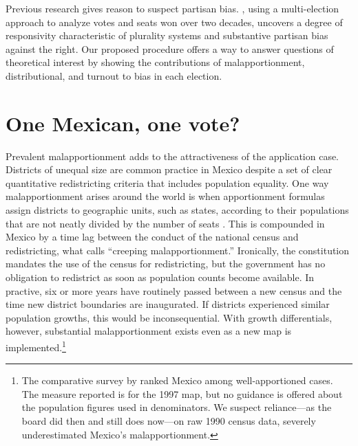 \documentclass[letter,12pt]{article}
\begin{document}
{Previous research gives reason to suspect partisan bias. \citet{marquez2014biasBlog}, using a multi-election approach to analyze votes and seats won over two decades, uncovers a degree of responsivity characteristic of plurality systems and substantive partisan bias against the right. Our proposed procedure offers a way to answer questions of theoretical interest by showing the contributions of malapportionment, distributional, and turnout to bias in each election. 

\section{One Mexican, one vote?}


Prevalent malapportionment adds to the attractiveness of the application case. Districts of unequal size are common practice in Mexico despite a set of clear quantitative redistricting criteria that includes population equality. One way malapportionment arises around the world is when apportionment formulas assign districts to geographic units, such as states, according to their populations that are not neatly divided by the number of seats \citep{balinskiYoung2001FairRep}. This is compounded in Mexico by a time lag between the conduct of the national census and redistricting, what \citet{JohnstonCreepingMal} calls ``creeping malapportionment.'' Ironically, the constitution mandates the use of the census for redistricting, but the government has no obligation to redistrict as soon as population counts become available. In practive, six or more years have routinely passed between a new census and the time new district boundaries are inaugurated. If districts experienced similar population growths, this would be inconsequential. With growth differentials, however, substantial malapportionment exists  even as a new map is implemented.\footnote{The comparative survey by \citet{snyder.samuelsMalapp2004} ranked Mexico among well-apportioned cases. The measure reported is for the 1997 map, but no guidance is offered about the population figures used in denominators. We suspect reliance---as the board did then and still does now---on raw 1990 census data, severely underestimated Mexico's malapportionment.}  

}
\end{document}
